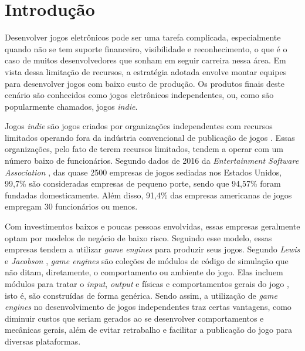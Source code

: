 \chapter*[Introdução]{Introdução}



Desenvolver jogos eletrônicos pode ser uma tarefa complicada, especialmente quando não se tem suporte financeiro, visibilidade e reconhecimento, o que é o caso de muitos desenvolvedores que sonham em seguir carreira nessa área. Em vista dessa limitação de recursos, a estratégia adotada envolve montar equipes para desenvolver jogos com baixo custo de produção. Os produtos finais deste cenário são conhecidos como jogos eletrônicos independentes, ou, como são popularmente chamados, jogos \textit{indie}.

Jogos \textit{indie} são jogos criados por organizações independentes com recursos limitados operando fora da indústria convencional de publicação de jogos \cite{end2end}. Essas organizações, pelo fato de terem recursos limitados, tendem a operar com um número baixo de funcionários. Segundo dados de 2016 da \textit{Entertainment Software Association} \cite{esa2016}, das quase 2500 empresas de jogos sediadas nos Estados Unidos, 99,7\% são consideradas empresas de pequeno porte, sendo que 94,57\% foram fundadas domesticamente. Além disso, 91,4\% das empresas americanas de jogos empregam 30 funcionários ou menos.

Com investimentos baixos e poucas pessoas envolvidas, essas empresas geralmente optam por modelos de negócio de baixo risco. Seguindo esse modelo, essas empresas tendem a utilizar \textit{game engines} para produzir seus jogos. Segundo \textit{Lewis} e \textit{Jacobson} \cite{gameengines}, \textit{game engines} são coleções de módulos de código de simulação que não ditam, diretamente, o comportamento ou ambiente do jogo. Elas incluem módulos para tratar o \textit{input}, \textit{output} e físicas e comportamentos gerais do jogo \cite{gameengines}, isto é, são construídas de forma genérica. Sendo assim, a utilização de \textit{game engines} no desenvolvimento de jogos independentes traz certas vantagens, como diminuir custos que seriam gerados ao se desenvolver comportamentos e mecânicas gerais, além de evitar retrabalho e facilitar a publicação do jogo para diversas plataformas.

